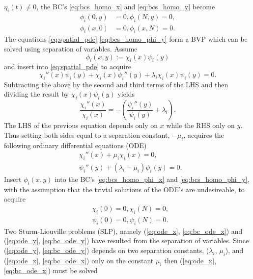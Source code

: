 \documentclass[\main/thesis.tex]{subfiles}
\begin{document}
$\eta_i(t) {\ne} 0$, the BC's \eqref{eq:bcs_homo_x} and \eqref{eq:bcs_homo_y} 
become
\begin{align}
	\phi_i(0, y) &{=} 0,
	\phi_i(N, y)  {=} 0,
	\label{eq:bcs_homo_phi_x} \\
	\phi_i(x, 0) &{=} 0,
	\phi_i(x, N)  {=} 0.
	\label{eq:bcs_homo_phi_y}
\end{align}
The equations \eqref{eq:spatial_pde}-\eqref{eq:bcs_homo_phi_y} form a BVP which 
can be solved using separation of variables. Assume
\begin{equation*}
	\phi_i(x, y) {:=} \chi_i(x) \psi_i(y)
\end{equation*}
and insert into 
\eqref{eq:spatial_pde} to acquire
\begin{equation*}
	\chi_i''(x) \psi_i(y) {+} \chi_i(x) \psi_i''(y)
	{+} \lambda_i \chi_i(x) \psi_i(y) {=} 0.
\end{equation*} 
Subtracting the above by the second and third terms of the LHS and then dividing 
the result by $\chi_i(x) \psi_i(y)$ yields
\begin{equation*}
	    \frac{\chi_i''(x)}
	         {\chi_i(x)}
	{=} {-} \left(
	              \frac{\psi_i''(y)}
	                   {\psi_i(y)}
	          {+} \lambda_i
	        \right).
\end{equation*}
The LHS of the previous equation depends only on $x$ while the RHS only on $y$. 
Thus setting both sides equal to a separation constant, $\minus \mu_i$, acquires 
the following ordinary differential equations (ODE)
\begin{align}
	&\chi_i''(x) {+} \mu_i \chi_i(x) {=} 0,
	\label{eq:ode_x} \\
	&\psi_i''(y) {+} (\lambda_i {-} \mu_i) \psi_i(y) {=} 0.
	\label{eq:ode_y}
\end{align}
Insert $\phi_i(x, y)$ into the BC's \eqref{eq:bcs_homo_phi_x} and 
\eqref{eq:bcs_homo_phi_y}, with the assumption that the trivial solutions of the 
ODE's are undesireable, to acquire
\begin{align}
	&\chi_i(0) {=} 0, \chi_i(N) {=} 0,
	\label{eq:bc_ode_x} \\
	&\psi_i(0) {=} 0, \psi_i(N) {=} 0.
	\label{eq:bc_ode_y}
\end{align} 
Two Sturm-Liouville problems (SLP), namely (\ref{eq:ode_x}, \ref{eq:bc_ode_x}) 
and (\ref{eq:ode_y}, \ref{eq:bc_ode_y}) have resulted from the separation of 
variables. Since (\ref{eq:ode_y}, \ref{eq:bc_ode_y}) depends on two separation 
constants, ($\lambda_i$, $\mu_i$), and (\ref{eq:ode_x}, \ref{eq:bc_ode_x}) only 
on the constant $\mu_i$ then (\ref{eq:ode_x}, \ref{eq:bc_ode_x}) must be solved 
\end{document}

